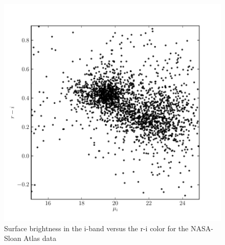 \documentclass[12pt,preprint,pdftex]{aastex}
\begin{document}
\begin{figure}
\centering
\includegraphics[trim = 15mm 0mm 0mm 0mm]{method_sb2_nsa.pdf}
\caption{Surface brightness in the i-band versus the r-i color for the NASA-Sloan Atlas data}
\end{figure}
\end{document}
